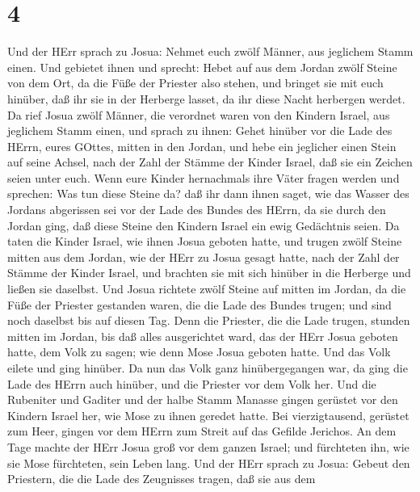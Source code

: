 \hypertarget{section-3}{%
\section{4}\label{section-3}}

 Und der HErr sprach zu Josua:  Nehmet euch
zwölf Männer, aus jeglichem Stamm einen.  Und gebietet ihnen
und sprecht: Hebet auf aus dem Jordan zwölf Steine von dem Ort, da die
Füße der Priester also stehen, und bringet sie mit euch hinüber, daß ihr
sie in der Herberge lasset, da ihr diese Nacht herbergen werdet.
 Da rief Josua zwölf Männer, die verordnet waren von den
Kindern Israel, aus jeglichem Stamm einen,  und sprach zu
ihnen: Gehet hinüber vor die Lade des HErrn, eures GOttes, mitten in den
Jordan, und hebe ein jeglicher einen Stein auf seine Achsel, nach der
Zahl der Stämme der Kinder Israel,  daß sie ein Zeichen
seien unter euch. Wenn eure Kinder hernachmals ihre Väter fragen werden
und sprechen: Was tun diese Steine da?  daß ihr dann ihnen
saget, wie das Wasser des Jordans abgerissen sei vor der Lade des Bundes
des HErrn, da sie durch den Jordan ging, daß diese Steine den Kindern
Israel ein ewig Gedächtnis seien.  Da taten die Kinder
Israel, wie ihnen Josua geboten hatte, und trugen zwölf Steine mitten
aus dem Jordan, wie der HErr zu Josua gesagt hatte, nach der Zahl der
Stämme der Kinder Israel, und brachten sie mit sich hinüber in die
Herberge und ließen sie daselbst.  Und Josua richtete zwölf
Steine auf mitten im Jordan, da die Füße der Priester gestanden waren,
die die Lade des Bundes trugen; und sind noch daselbst bis auf diesen
Tag.  Denn die Priester, die die Lade trugen, stunden
mitten im Jordan, bis daß alles ausgerichtet ward, das der HErr Josua
geboten hatte, dem Volk zu sagen; wie denn Mose Josua geboten hatte. Und
das Volk eilete und ging hinüber.  Da nun das Volk ganz
hinübergegangen war, da ging die Lade des HErrn auch hinüber, und die
Priester vor dem Volk her.  Und die Rubeniter und Gaditer
und der halbe Stamm Manasse gingen gerüstet vor den Kindern Israel her,
wie Mose zu ihnen geredet hatte.  Bei vierzigtausend,
gerüstet zum Heer, gingen vor dem HErrn zum Streit auf das Gefilde
Jerichos.  An dem Tage machte der HErr Josua groß vor dem
ganzen Israel; und fürchteten ihn, wie sie Mose fürchteten, sein Leben
lang.  Und der HErr sprach zu Josua:  Gebeut
den Priestern, die die Lade des Zeugnisses tragen, daß sie aus dem
